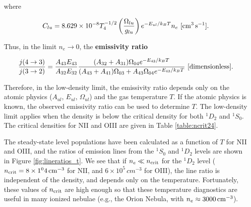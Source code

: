 \documentclass[a4paper,10pt]{article}
\begin{document}
{\noindent}where

\begin{align*}
    C_{lu} = 8.629\times10^{-8}T_4^{-1/2} \left(\frac{\Omega_{lu}}{g_{lu}}\right) e^{-E_{ul}/k_BT}n_e ~ [{\rm cm^3\,s^{-1}}].
\end{align*}

{\noindent}Thus, in the limit $n_e\rightarrow0$, the \textbf{emissivity ratio}

\begin{align*}
    \frac{j(4\rightarrow3)}{j(3\rightarrow2)} = \frac{A_{43}E_{43}}{A_{32}E_{32}} \frac{(A_{32}+A_{31}) \Omega_{04}e^{-E_{43}/k_BT}}{(A_{43}+A_{41})\Omega_{03} + A_{43}\Omega_{04}e^{-E_{43}/k_BT}} ~ [{\rm dimensionless}].
\end{align*}

{\noindent}Therefore, in the low-density limit, the emissivity ratio depends only on the atomic physics ($A_{ul}$, $E_{ul}$, $\Omega_{ul}$) and the gas temperature $T$. If the atomic physics is known, the observed emissivity ratio can be used to determine $T$. The low-density limit applies when the density is below the critical density for both $^1D_2$ and $^1S_0$. The critical densities for NII and OIII are given in Table \ref{table:ncrit24}.

{\noindent}The steady-state level populations have been calculated as a function of $T$ for NII and OIII, and the ratios of emission lines from the $^1S_0$ and $^1D_2$ levels are shown in Figure \ref{fig:lineratios_t}. We see that if $n_e\ll n_{\rm crit}$ for the $^1D_2$ level ($n_{\rm crit}=8\times1^04\,{\rm cm^{-3}}$ for NII, and $6\times10^5\,{cm^{-3}}$ for OIII), the line ratio is independent of the density, and depends only on the temperature. Fortunately, these values of $n_{\rm crit}$ are high enough so that these temperature diagnostics are useful in many ionized nebulae (e.g., the Orion Nebula, with $n_e\approx3000\,{\rm cm^{-3}}$).
\end{document}
